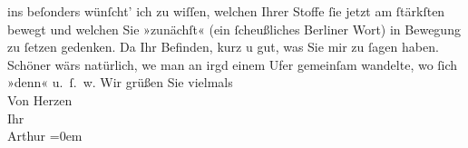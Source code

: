 \begin{ledgroupsized}[t]{13cm}
               ins beſonders wünſcht’ ich zu wiſſen, welchen Ihrer Stoffe ſie jetzt am ſtärkſten
               bewegt und welchen Sie »zunächſt« (ein ſcheußliches Berliner Wort) in Bewegung zu ſetzen gedenken. Da{\geminationn} Ihr Befinden, kurz u gut, was Sie mir \introOben{}zu\introOben{} ſagen haben. Schöner wärs natürlich, we{\geminationn}{ }{\pb}man an irgd einem Ufer gemeinſam wandelte,
               wo ſich »denn« u. ſ. w. \pend
           \pstart
           Wir grüßen Sie vielmals {\\[\baselineskip]}Von Herzen {\\[\baselineskip]}Ihr {\\[\baselineskip]}\spacefill\mbox{Arthur}\pend
           \leftskip=0em{}
         
         \endnumbering{}\end{ledgroupsized}\begin{anhang}\end{anhang}\newcommand{\dateiname}{L03009}\newcommand{\titel}{Arthur Schnitzler an Felix Salten, 5. 8. 1907}\newcommand{\editorInnen}{Martin Anton Müller und Laura Untner}
      